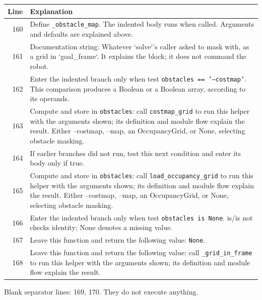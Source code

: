 \documentclass[11pt,a4paper]{book}
\begin{document}
\begin{longtable}{r p{}}

\textbf{Line} & \textbf{Explanation} \\ \hline \endhead

160 & Define \texttt{\_obstacle\_map}. The indented body runs when called. Arguments and defaults are explained above. \\

161 & Documentation string: Whatever `solve`'s caller asked to mask with, as a grid in `goal\_frame`. It explains the block; it does not command the robot. \\

162 & Enter the indented branch only when test \texttt{obstacles == '--costmap'}. This comparison produces a Boolean or a Boolean array, according to its operands. \\

163 & Compute and store in \texttt{obstacles}: call \texttt{costmap\_grid} to run this helper with the arguments shown; its definition and module flow explain the result. Either --costmap, --map, an OccupancyGrid, or None, selecting obstacle masking. \\

164 & If earlier branches did not run, test this next condition and enter its body only if true. \\

165 & Compute and store in \texttt{obstacles}: call \texttt{load\_occupancy\_grid} to run this helper with the arguments shown; its definition and module flow explain the result. Either --costmap, --map, an OccupancyGrid, or None, selecting obstacle masking. \\

166 & Enter the indented branch only when test \texttt{obstacles is None}. is/is not checks identity; None denotes a missing value. \\

167 & Leave this function and return the following value: \texttt{None}. \\

168 & Leave this function and return the following value: call \texttt{\_grid\_in\_frame} to run this helper with the arguments shown; its definition and module flow explain the result. \\

\end{longtable}

Blank separator lines: 169, 170. They do not execute anything.
\end{document}
